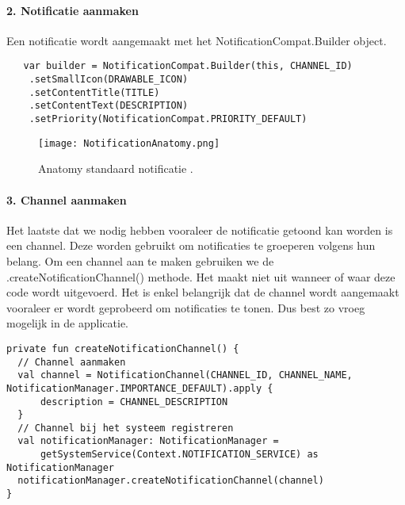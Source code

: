 \paragraph{2. Notificatie aanmaken}
Een notificatie wordt aangemaakt met het NotificationCompat.Builder object. 
\begin{verbatim}
   var builder = NotificationCompat.Builder(this, CHANNEL_ID)
    .setSmallIcon(DRAWABLE_ICON)
    .setContentTitle(TITLE)
    .setContentText(DESCRIPTION)
    .setPriority(NotificationCompat.PRIORITY_DEFAULT)
\end{verbatim}
\begin{figure}[H]
    \centering
    \texttt{[image: NotificationAnatomy.png]}
    \caption{Anatomy standaard notificatie .}%
\end{figure}

\paragraph{3. Channel aanmaken}
Het laatste dat we nodig hebben vooraleer de notificatie getoond kan worden is een channel. Deze worden 
gebruikt om notificaties te groeperen volgens hun belang. Om een channel aan te maken gebruiken we 
de .createNotificationChannel() methode. Het maakt niet uit wanneer of waar deze code wordt uitgevoerd. 
Het is enkel belangrijk dat de channel wordt aangemaakt vooraleer er wordt geprobeerd om notificaties 
te tonen. Dus best zo vroeg mogelijk in de applicatie.
\begin{verbatim}
private fun createNotificationChannel() {
  // Channel aanmaken
  val channel = NotificationChannel(CHANNEL_ID, CHANNEL_NAME, NotificationManager.IMPORTANCE_DEFAULT).apply {
      description = CHANNEL_DESCRIPTION
  }
  // Channel bij het systeem registreren
  val notificationManager: NotificationManager =
      getSystemService(Context.NOTIFICATION_SERVICE) as NotificationManager
  notificationManager.createNotificationChannel(channel)
}
\end{verbatim}


